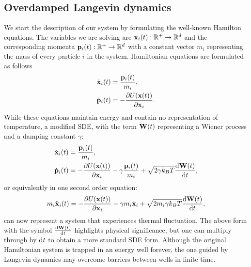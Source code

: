\subsection{Overdamped Langevin dynamics}
We start the description of our system by formulating the well-known Hamilton equations. The variables we are solving are $\mathbf{x}_i(t): \mathbb{R}^+ \to \mathbb{R}^d$ and the corresponding momenta $\mathbf{p}_i(t): \mathbb{R}^+ \to \mathbb{R}^d$ with a constant vector $m_i$ representing the mass of every particle $i$ in the system. Hamiltonian equations are formulated as follows
\begin{equation} \label{eq:md_standard}
\begin{split}
   \dot{\mathbf{x}}_i(t) &= \frac{\mathbf{p}_i(t)}{m_i}, \\
   \dot{\mathbf{p}}_i(t) &= -\frac{\partial U(\mathbf{x}(t))}{\partial \mathbf{x}_i}.
\end{split}
\end{equation}
While these equations maintain energy and contain no representation of temperature, a modified SDE, with the term $\mathbf{W}(t)$ representing a Wiener process and a damping constant $\gamma$:
\begin{equation} \label{eq:full_langevin}
\begin{split}
   \dot{\xx}_i(t) &= \frac{{\pp_i(t)}}{m_i}, \\
   \dot{\pp}_i(t) &= -\frac{\partial U(\xx(t))}{\partial \xx_i} - \gamma \frac{\pp_i(t)}{m_i} + \sqrt{2 \gamma k_B T} \odv{\mb{W}(t)}{t},
\end{split}
\end{equation}
or equivalently in one second order equation:
\begin{equation}
    m_i \Ddot{\xx}_i(t) = -\frac{\partial U(\xx(t))}{\partial \xx_i} - \gamma m_i \dot{\xx}_i + \sqrt{2 m_i \gamma k_B T} \odv{\mb{W}(t)}{t},
\end{equation}
can now represent a system that experiences thermal fluctuation. The above form with the symbol $\odv{\mb{W}(t)}{t}$ highlights physical significance, but one can multiply through by $\odif{t}$ to obtain a more standard SDE form. Although the original Hamiltonian system is trapped in an energy well forever, the one guided by Langevin dynamics may overcome barriers between wells in finite time.

